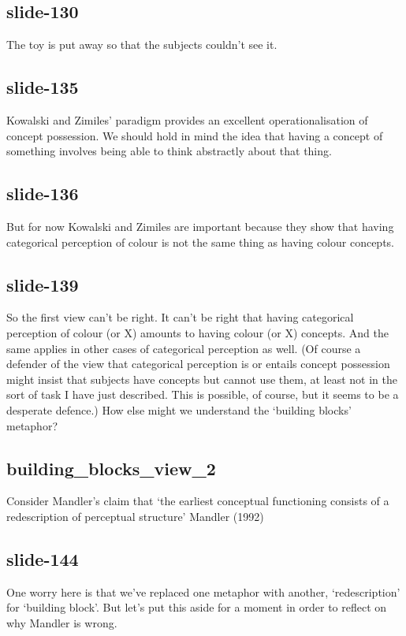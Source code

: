 \documentclass[12pt,\papersize]{extarticle}
\begin{document}
 
\subsection{slide-130}
The toy is put away so that the subjects couldn't see it.
 
 
\subsection{slide-135}
Kowalski and Zimiles' paradigm provides an excellent operationalisation of concept possession.
We should hold in mind the idea that having a concept of something involves being able to think abstractly about that thing.
 
 
\subsection{slide-136}
But for now Kowalski and Zimiles are important because they show that having categorical perception of colour is not the same thing as having colour concepts.
 
 
\subsection{slide-139}
So the first view can't be right.
It can't be right that having categorical perception of colour (or X) amounts to having colour (or X) concepts.
And the same applies in other cases of categorical perception as well.
(Of course a defender of the view that categorical perception is or entails concept possession might insist that subjects have concepts but cannot use them, at least not in the sort of task I have just described. This is possible, of course, but it seems to be a desperate defence.)
How else might we understand the ‘building blocks’ metaphor?
 
 
\subsection{building\_blocks\_view\_2}
Consider Mandler's claim that ‘the earliest conceptual functioning consists of a redescription of perceptual structure’
Mandler (1992)

 
 
\subsection{slide-144}
One worry here is that we've replaced one metaphor with another, ‘redescription’ for ‘building block’.
But let's put this aside for a moment in order to reflect on why Mandler is wrong.
 
\end{document}
